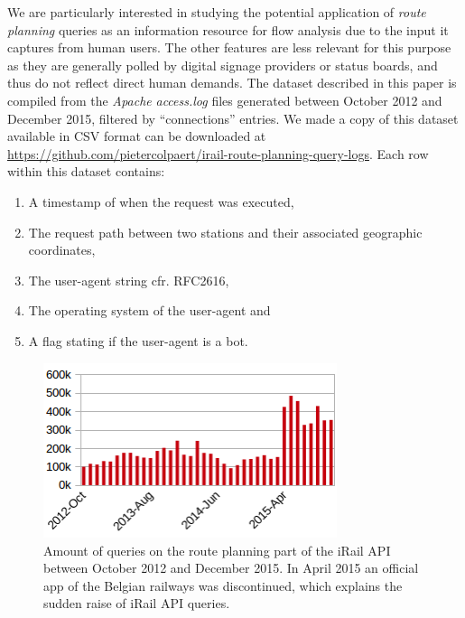 \documentclass{sig-alternate}
\begin{document}
We are particularly interested in studying the potential application of \emph{route planning} queries as an information resource for flow analysis due to the input it captures from human users.
The other features are less relevant for this purpose as they are generally polled by digital signage providers or status boards, and thus do not reflect direct human demands.
The dataset described in this paper is compiled from the \emph{Apache} \emph{access.log} files generated between October 2012 and December 2015, filtered by ``connections'' entries.
We made a copy of this dataset available in CSV format can be downloaded at \url{https://github.com/pietercolpaert/irail-route-planning-query-logs}.
Each row within this dataset contains:
\begin{enumerate}
\item A timestamp of when the request was executed,
\item The request path between two stations and their associated geographic coordinates,
\item The user-agent string cfr. RFC2616,
\item The operating system of the user-agent and
\item A flag stating if the user-agent is a bot.
\end{enumerate}

\begin{figure}
\centering
\includegraphics[width=8.6cm]{querylogs}
\caption{Amount of queries on the route planning part of the iRail API between October 2012 and December 2015. In April 2015 an official app of the Belgian railways was discontinued, which explains the sudden raise of iRail API queries.}
\label{fig:querylogs}
\end{figure}
\end{document}
